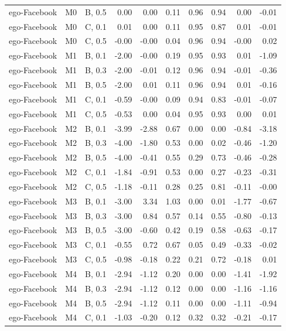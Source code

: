 \begin{longtable}{lllrrrrrrr}
ego-Facebook & M0 & B, 0.5 & 0.00 & 0.00 & 0.11 & 0.96 & 0.94 & 0.00 & -0.01 \\
ego-Facebook & M0 & C, 0.1 & 0.01 & 0.00 & 0.11 & 0.95 & 0.87 & 0.01 & -0.01 \\
ego-Facebook & M0 & C, 0.5 & -0.00 & -0.00 & 0.04 & 0.96 & 0.94 & -0.00 & 0.02 \\
ego-Facebook & M1 & B, 0.1 & -2.00 & -0.00 & 0.19 & 0.95 & 0.93 & 0.01 & -1.09 \\
ego-Facebook & M1 & B, 0.3 & -2.00 & -0.01 & 0.12 & 0.96 & 0.94 & -0.01 & -0.36 \\
ego-Facebook & M1 & B, 0.5 & -2.00 & 0.01 & 0.11 & 0.96 & 0.94 & 0.01 & -0.16 \\
ego-Facebook & M1 & C, 0.1 & -0.59 & -0.00 & 0.09 & 0.94 & 0.83 & -0.01 & -0.07 \\
ego-Facebook & M1 & C, 0.5 & -0.53 & 0.00 & 0.04 & 0.95 & 0.93 & 0.00 & 0.01 \\
ego-Facebook & M2 & B, 0.1 & -3.99 & -2.88 & 0.67 & 0.00 & 0.00 & -0.84 & -3.18 \\
ego-Facebook & M2 & B, 0.3 & -4.00 & -1.80 & 0.53 & 0.00 & 0.02 & -0.46 & -1.20 \\
ego-Facebook & M2 & B, 0.5 & -4.00 & -0.41 & 0.55 & 0.29 & 0.73 & -0.46 & -0.28 \\
ego-Facebook & M2 & C, 0.1 & -1.84 & -0.91 & 0.53 & 0.00 & 0.27 & -0.23 & -0.31 \\
ego-Facebook & M2 & C, 0.5 & -1.18 & -0.11 & 0.28 & 0.25 & 0.81 & -0.11 & -0.00 \\
ego-Facebook & M3 & B, 0.1 & -3.00 & 3.34 & 1.03 & 0.00 & 0.01 & -1.77 & -0.67 \\
ego-Facebook & M3 & B, 0.3 & -3.00 & 0.84 & 0.57 & 0.14 & 0.55 & -0.80 & -0.13 \\
ego-Facebook & M3 & B, 0.5 & -3.00 & -0.60 & 0.42 & 0.19 & 0.58 & -0.63 & -0.17 \\
ego-Facebook & M3 & C, 0.1 & -0.55 & 0.72 & 0.67 & 0.05 & 0.49 & -0.33 & -0.02 \\
ego-Facebook & M3 & C, 0.5 & -0.98 & -0.18 & 0.22 & 0.21 & 0.72 & -0.18 & 0.01 \\
ego-Facebook & M4 & B, 0.1 & -2.94 & -1.12 & 0.20 & 0.00 & 0.00 & -1.41 & -1.92 \\
ego-Facebook & M4 & B, 0.3 & -2.94 & -1.12 & 0.12 & 0.00 & 0.00 & -1.16 & -1.16 \\
ego-Facebook & M4 & B, 0.5 & -2.94 & -1.12 & 0.11 & 0.00 & 0.00 & -1.11 & -0.94 \\
ego-Facebook & M4 & C, 0.1 & -1.03 & -0.20 & 0.12 & 0.32 & 0.32 & -0.21 & -0.17 \\

\end{longtable}
